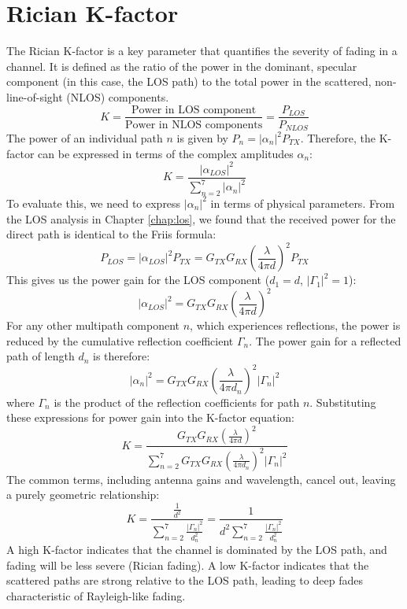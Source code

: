 \section{Rician K-factor}
The Rician K-factor is a key parameter that quantifies the severity of fading in a channel. It is defined as the ratio of the power in the dominant, specular component (in this case, the LOS path) to the total power in the scattered, non-line-of-sight (NLOS) components.
\begin{equation}
	K = \frac{\text{Power in LOS component}}{\text{Power in NLOS components}} = \frac{P_{LOS}}{P_{NLOS}}
\end{equation}
The power of an individual path $n$ is given by $P_n = |\alpha_n|^2 P_{TX}$. Therefore, the K-factor can be expressed in terms of the complex amplitudes $\alpha_n$:
\begin{equation}
	K = \frac{|\alpha_{LOS}|^2}{\sum_{n=2}^{7} |\alpha_n|^2}
\end{equation}
To evaluate this, we need to express $|\alpha_n|^2$ in terms of physical parameters. From the LOS analysis in Chapter \ref{chap:los}, we found that the received power for the direct path is identical to the Friis formula:
\begin{equation}
	P_{LOS} = |\alpha_{LOS}|^2 P_{TX} = G_{TX} G_{RX} \left( \frac{\lambda}{4\pi d} \right)^2 P_{TX}
\end{equation}
This gives us the power gain for the LOS component ($d_1=d$, $|\Gamma_1|^2=1$):
\begin{equation}
	|\alpha_{LOS}|^2 = G_{TX} G_{RX} \left( \frac{\lambda}{4\pi d} \right)^2
\end{equation}
For any other multipath component $n$, which experiences reflections, the power is reduced by the cumulative reflection coefficient $\Gamma_n$. The power gain for a reflected path of length $d_n$ is therefore:
\begin{equation}
	|\alpha_n|^2 = G_{TX} G_{RX} \left( \frac{\lambda}{4\pi d_n} \right)^2 |\Gamma_n|^2
\end{equation}
where $\Gamma_n$ is the product of the reflection coefficients for path $n$. Substituting these expressions for power gain into the K-factor equation:
\begin{equation}
	K = \frac{G_{TX} G_{RX} \left( \frac{\lambda}{4\pi d} \right)^2}{\sum_{n=2}^{7} G_{TX} G_{RX} \left( \frac{\lambda}{4\pi d_n} \right)^2 |\Gamma_n|^2}
\end{equation}
The common terms, including antenna gains and wavelength, cancel out, leaving a purely geometric relationship:
\begin{equation}
	K = \frac{\frac{1}{d^2}}{\sum_{n=2}^{7} \frac{|\Gamma_n|^2}{d_n^2}} = \frac{1}{d^2 \sum_{n=2}^{7} \frac{|\Gamma_n|^2}{d_n^2}}
\end{equation}
A high K-factor indicates that the channel is dominated by the LOS path, and fading will be less severe (Rician fading). A low K-factor indicates that the scattered paths are strong relative to the LOS path, leading to deep fades characteristic of Rayleigh-like fading.

